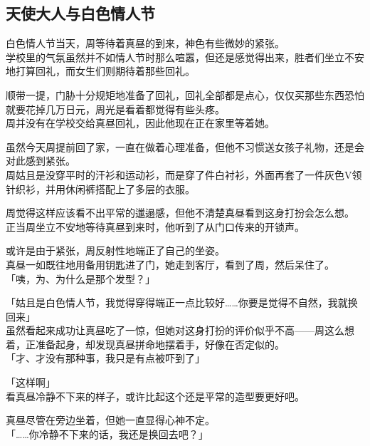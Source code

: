 \subsection{天使大人与白色情人节}

白色情人节当天，周等待着真昼的到来，神色有些微妙的紧张。\\

学校里的气氛虽然并不如情人节时那么喧嚣，但还是感觉得出来，胜者们坐立不安地打算回礼，而女生们则期待着那些回礼。

顺带一提，门胁十分规矩地准备了回礼，回礼全部都是点心，仅仅买那些东西恐怕就要花掉几万日元，周光是看着都觉得有些头疼。\\

周并没有在学校交给真昼回礼，因此他现在正在家里等着她。

虽然今天周提前回了家，一直在做着心理准备，但他不习惯送女孩子礼物，还是会对此感到紧张。\\

周姑且是没穿平时的汗衫和运动衫，而是穿了件白衬衫，外面再套了一件灰色V领针织衫，并用休闲裤搭配上了多层的衣服。 %

周觉得这样应该看不出平常的邋遢感，但他不清楚真昼看到这身打扮会怎么想。\\

正当周坐立不安地等待真昼到来时，他听到了从门口传来的开锁声。

或许是由于紧张，周反射性地端正了自己的坐姿。\\

真昼一如既往地用备用钥匙进了门，她走到客厅，看到了周，然后呆住了。\\

「咦，为、为什么是那个发型？」

「姑且是白色情人节，我觉得穿得端正一点比较好……你要是觉得不自然，我就换回来」\\

虽然看起来成功让真昼吃了一惊，但她对这身打扮的评价似乎不高——周这么想着，正准备起身，却发现真昼拼命地摆着手，好像在否定似的。\\

「才、才没有那种事，我只是有点被吓到了」

「这样啊」\\

看真昼冷静不下来的样子，或许比起这个还是平常的造型要更好吧。

真昼尽管在旁边坐着，但她一直显得心神不定。\\

「……你冷静不下来的话，我还是换回去吧？」

